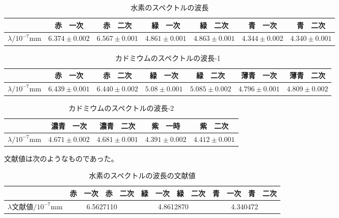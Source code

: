 \documentclass{jsarticle}
\begin{document}
\begin{table}[]
\centering
\caption{水素のスペクトルの波長}
\label{my-label}
\begin{tabular}{|c|c|c|c|c|c|c|}
\hline
          & 赤　一次  & 赤　二次  & 緑　一次  & 緑　二次  & 青　一次  & 青　二次  \\ \hline
$\lambda/10^{-7}$mm & $6.374\pm0.002$ & $6.567\pm0.001$ & $4.861\pm0.001$ & $4.863\pm0.001$ & $4.344\pm0.002$ & $4.340\pm0.001$ \\ \hline
\end{tabular}
\end{table}


\begin{table}[H]
    \centering
    \caption{カドミウムのスペクトルの波長-1}
    \label{my-label}
    \begin{tabular}{|c|c|c|c|c|c|c|}
    \hline
             & 赤　一次  & 赤　二次  & 緑　一次  & 緑　二次  & 薄青　一次 & 薄青　二次 \\ \hline
    $\lambda/10^{-7}$mm & $6.439 \pm0.001$ & $6.440\pm0.002$ & $5.08\pm0.001$ & $5.085\pm0.002$ & $4.796\pm0.001$ & $4.809\pm0.002$ \\ \hline
    \end{tabular}
    \end{table}

    \begin{table}[H]
        \centering
        \caption{カドミウムのスペクトルの波長-2}
        \label{my-label}
        \begin{tabular}{|c|c|c|c|c|}
        \hline
                 & 濃青　一次 & 濃青　二次 & 紫　一時  & 紫　二次  \\ \hline
        $\lambda/10^{-7}$mm & $4.671\pm0.002$ & $4.681\pm0.001$ & $4.391\pm0.002$ & $4.412\pm0.001$ \\ \hline
        \end{tabular}
        \end{table}

文献値は次のようなものであった。

\begin{table}[H]
    \centering
    \caption{水素のスペクトルの波長の文献値}
    \label{my-label}
    \begin{tabular}{|c|c|c|c|c|c|c|}
    \hline
              & 赤　一次           & 赤　二次          & 緑　一次           & 緑　二次          & 青　一次          & 青　二次          \\ \hline
    $\lambda$文献値$ /10^{-7}$mm & \multicolumn{2}{c|}{6.5627110} & \multicolumn{2}{c|}{4.8612870} & \multicolumn{2}{c|}{4.340472} \\ \hline
    \end{tabular}
    \end{table}
\end{document}

